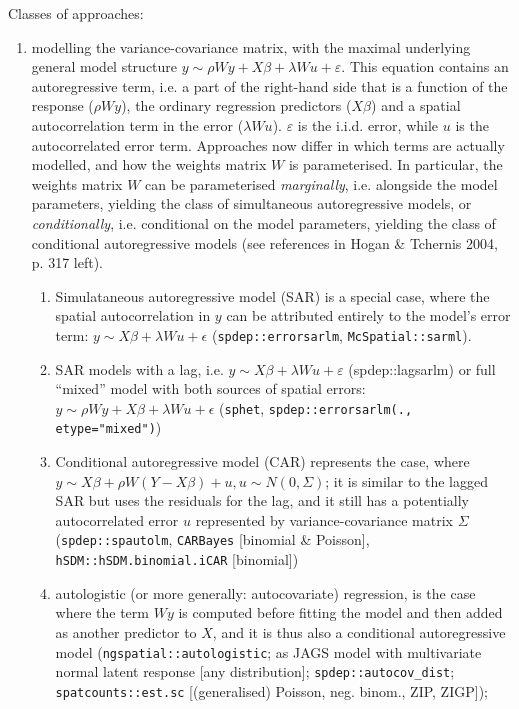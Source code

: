 \documentclass[11pt]{article}
\begin{document}
Classes of approaches:
\begin{enumerate}
\item modelling the variance-covariance matrix, with the maximal underlying general model structure $y \sim \rho W y + X \beta + \lambda W u + \varepsilon$. This equation contains an autoregressive term, i.e. a part of the right-hand side that is a function of the response ($\rho W y$), the ordinary regression predictors ($X\beta$) and a spatial autocorrelation term in the error ($\lambda W u$). $\varepsilon$ is the i.i.d. error, while $u$ is the autocorrelated error term. Approaches now differ in which terms are actually modelled, and how the weights matrix $W$ is parameterised.%
In particular, the weights matrix $W$ can be parameterised \emph{marginally}, i.e. alongside the model parameters, yielding the class of simultaneous autoregressive models, or \emph{conditionally}, i.e. conditional on the model parameters, yielding the class of conditional autoregressive models (see references in Hogan \& Tchernis 2004, p. 317 left).
\begin{enumerate}
	\item Simulataneous autoregressive model (SAR) is a special case, where the spatial autocorrelation in $y$ can be attributed entirely to the model's error term: $y \sim X\beta + \lambda W u + \epsilon$ (\texttt{spdep::errorsarlm}, \texttt{McSpatial::sarml}).
	\item SAR models with a lag, i.e. $y \sim X\beta + \lambda W u + \varepsilon$ (spdep::lagsarlm) or full ``mixed'' model with both sources of spatial errors: $y \sim \rho W y + X\beta + \lambda W u + \epsilon$ (\texttt{sphet}, \texttt{spdep::errorsarlm(., etype="mixed")})
	\item Conditional autoregressive model (CAR) represents the case, where $y \sim X\beta + \rho W (Y - X\beta) + u, u \sim N(0, \Sigma)$; it is similar to the lagged SAR but uses the residuals for the lag, and it still has a potentially autocorrelated error $u$ represented by variance-covariance matrix $\Sigma$ (\texttt{spdep::spautolm}, \texttt{CARBayes} [binomial \& Poisson], \texttt{hSDM::hSDM.binomial.iCAR} [binomial])
	\item autologistic (or more generally: autocovariate) regression, is the case where the term $Wy$ is computed before fitting the model and then added as another predictor to $X$, and it is thus also a conditional autoregressive model (\texttt{ngspatial::autologistic}; as JAGS model with multivariate normal latent response [any distribution]; \texttt{spdep::autocov\_dist}; \texttt{spatcounts::est.sc} [(generalised) Poisson, neg. binom., ZIP, ZIGP]); 

\end{enumerate}
\end{enumerate}
\end{document}
